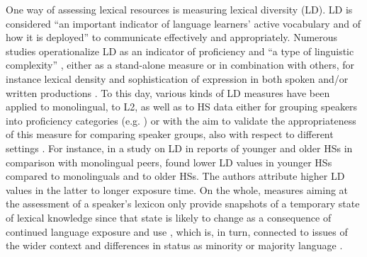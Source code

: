 \documentclass[output=paper,colorlinks,citecolor=brown]{langscibook}
\begin{document}
One way of assessing lexical resources is measuring lexical diversity (LD). LD is considered ``an important indicator of language learners’ active vocabulary and of how it is deployed'' \citep[85]{MalvernRichads2002AccommodationLD} to communicate effectively and appropriately. Numerous studies operationalize LD as an indicator of proficiency and ``a type of linguistic complexity'' \citep[95]{Jarvis2013DiversityinLD}, either as a stand-alone measure or in combination with others, for instance lexical density and sophistication of expression \citep{BonvinEtAl2018Entwicklung, GharibiBoers2019LexicalRichness, ElabdaliWeinOrtega2022LDBilingually} in both spoken and/or written productions \citep{LauferNation1995VocabSize, MalvernRichads2002AccommodationLD, PennockSpeckClavelArroitia2021LDWrittenSpoken}. To this day, various kinds of LD measures have been applied to monolingual, to L2, as well as to HS data either for grouping speakers into proficiency categories (e.g. \citealt{KopotevKisselevPolinsky2020Collocations}) or with the aim to validate the appropriateness of this measure for comparing speaker groups, also with respect to different settings \citep{DallervanHoutTreffersDaller2003Richness, Yu2009LDWritingSpeaking, HrzicaRoch2021LDCroatianItalian, PetersenFogetHansenThøgersenKühl2021Proficiency}. For instance, in a study on LD in reports of younger and older HSs in comparison with monolingual peers, \citet{GharibiBoers2019LexicalRichness} found lower LD values in younger HSs compared to monolinguals and to older HSs. The authors attribute higher LD values in the latter to longer exposure time. On the whole, measures aiming at the assessment of a speaker's lexicon only provide snapshots of a temporary state of lexical knowledge since that state is likely to change as a consequence of continued language exposure and use \citep{Yu2009LDWritingSpeaking, CzapkaTopajGagarina2021LongitudinalLexDevelopment, Lambelet2021LDDevelopment}, which is, in turn, connected to issues of the wider context and differences in status as minority or majority language \citep{TreffersKorybski2016Measures, TreffersDaller2019DominanceDef}.
\end{document}
